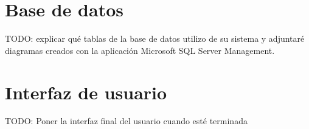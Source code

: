 \section{Base de datos}


TODO: explicar qué tablas de la base de datos utilizo de su sistema y adjuntaré  diagramas creados con la aplicación Microsoft SQL Server Management. \\

\section{Interfaz de usuario}


TODO: Poner la interfaz final del usuario cuando esté terminada
